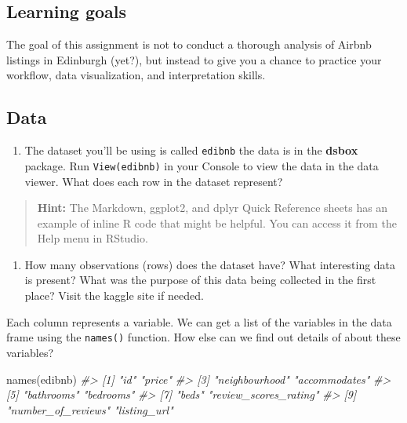 \documentclass[
]{book}
\newenvironment{Shaded}{\begin{snugshade}}{\end{snugshade}}
\newcommand{\CommentTok}[1]{\textcolor[rgb]{0.56,0.35,0.01}{\textit{#1}}}
\newcommand{\FunctionTok}[1]{\textcolor[rgb]{0.00,0.00,0.00}{#1}}
\newcommand{\NormalTok}[1]{#1}
\providecommand{\tightlist}{%
  \setlength{\itemsep}{0pt}\setlength{\parskip}{0pt}}
\begin{document}
\hypertarget{learning-goals}{%
\subsection{Learning goals}\label{learning-goals}}

The goal of this assignment is not to conduct a thorough analysis of Airbnb listings in Edinburgh (yet?), but instead to give you a chance to practice your workflow, data visualization, and interpretation skills.

\hypertarget{data}{%
\subsection{Data}\label{data}}

\begin{enumerate}
\def\labelenumi{\arabic{enumi}.}
\setcounter{enumi}{1}
\tightlist
\item
  The dataset you'll be using is called \texttt{edibnb} the data is in the \textbf{dsbox} package. Run \texttt{View(edibnb)} in your Console to view the data in the data viewer. What does each row in the dataset represent?
\end{enumerate}

\begin{quote}
\textbf{Hint:} The Markdown, ggplot2, and dplyr Quick Reference sheets has an example of inline R code that might be helpful. You can access it from the Help menu in RStudio.
\end{quote}

\begin{enumerate}
\def\labelenumi{\arabic{enumi}.}
\setcounter{enumi}{2}
\tightlist
\item
  How many observations (rows) does the dataset have? What interesting data is present? What was the purpose of this data being collected in the first place? Visit the kaggle site if needed.
\end{enumerate}

Each column represents a variable. We can get a list of the variables in the data frame using the \texttt{names()} function. How else can we find out details of about these variables?

\begin{Shaded}
\begin{Highlighting}[]
\FunctionTok{names}\NormalTok{(edibnb)}
\CommentTok{\#\textgreater{}  [1] "id"                   "price"               }
\CommentTok{\#\textgreater{}  [3] "neighbourhood"        "accommodates"        }
\CommentTok{\#\textgreater{}  [5] "bathrooms"            "bedrooms"            }
\CommentTok{\#\textgreater{}  [7] "beds"                 "review\_scores\_rating"}
\CommentTok{\#\textgreater{}  [9] "number\_of\_reviews"    "listing\_url"}
\end{Highlighting}
\end{Shaded}
\end{document}
